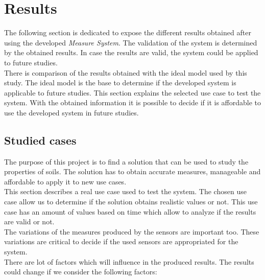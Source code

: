 
\chapter{Results}

The following section is dedicated to expose the different results obtained after using the developed \textit{Measure System}. The validation of the system is determined by the obtained results. In case the results are valid, the system could be applied to future studies.\\

There is comparison of the results obtained with the ideal model used by this study. The ideal model is the base to determine if the developed system is applicable to future studies. This section explains the selected use case to test the system. With the obtained information it is possible to decide if it is affordable to use the developed system in future studies.

\section{Studied cases}

The purpose of this project is to find a solution that can be used to study the properties of soils. The solution has to obtain accurate measures, manageable and affordable to apply it to new use cases.\\

This section describes a real use case used to test the system. The chosen use case allow us to determine if the solution obtains realistic values or not. This use case has an amount of values based on time which allow to analyze if the results are valid or not.\\

The variations of the measures produced by the sensors are important too. These variations are critical to decide if the used sensors are appropriated for the system.\\

There are lot of factors which will influence in the produced results. The results could change if we consider the following factors:

